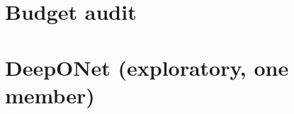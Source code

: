 \documentclass[11pt]{article}
\begin{document}
\begin{center}
\footnotesize

\end{center}

\section{Budget audit}

\begin{center}
\footnotesize

\end{center}

\section{DeepONet (exploratory, one member)}

\begin{center}
\footnotesize

\end{center}
\end{document}
